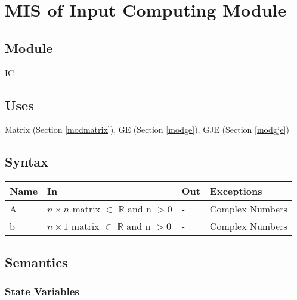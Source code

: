 \documentclass[12pt, titlepage]{article}
\begin{document}

\newpage


\section{MIS of {Input Computing Module}} \label{modic} %

\subsection{Module}

IC


\subsection{Uses}
Matrix (Section \ref{modmatrix}), GE (Section \ref{modge}), GJE (Section \ref{modgje}) 


\subsection{Syntax}

\begin{center}
\begin{tabular}{p{2cm} p{4cm} p{4cm} p{2cm}}
\hline
\textbf{Name} & \textbf{In} & \textbf{Out} & \textbf{Exceptions} \\
\hline
A & $n \times n$ matrix $\in$ $\mathbb{R}$ and n $> 0$ & - & Complex Numbers \\
b & $n \times 1$ matrix $\in$ $\mathbb{R}$ and n $> 0$ & - & Complex Numbers \\
\hline
\end{tabular}
\end{center}


\subsection{Semantics}

\subsubsection{State Variables}
\end{document}
